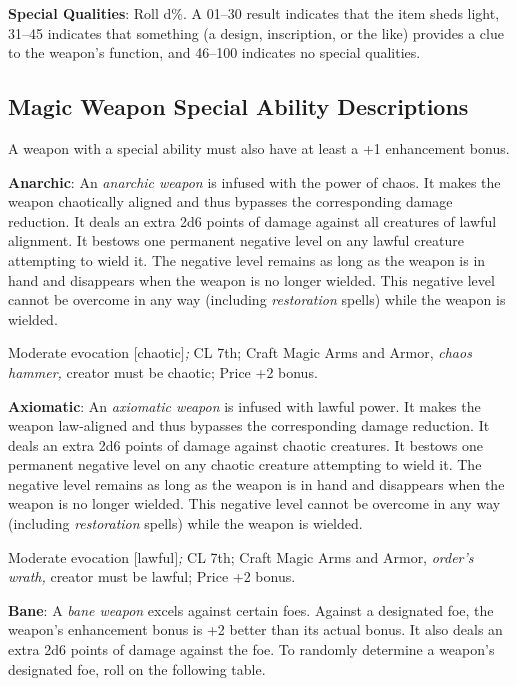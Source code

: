 \textbf{Special Qualities}: Roll d\%. A 01--30 result indicates that the item sheds light, 31--45 indicates that something (a design, inscription, or the like) provides a clue to the weapon's function, and 46--100 indicates no special qualities. 
				
\subsection{Magic Weapon Special Ability Descriptions}

				
A weapon with a special ability must also have at least a +1 enhancement bonus.
				
\textbf{Anarchic}: An \textit{anarchic weapon} is infused with the power of chaos. It makes the weapon chaotically aligned and thus bypasses the corresponding damage reduction. It deals an extra 2d6 points of damage against all creatures of lawful alignment. It bestows one permanent negative level on any lawful creature attempting to wield it. The negative level remains as long as the weapon is in hand and disappears when the weapon is no longer wielded. This negative level cannot be overcome in any way (including \textit{restoration }spells) while the weapon is wielded.
				
Moderate evocation \mbox{$[$}chaotic\mbox{$]$}\textit{; }CL 7th; Craft Magic Arms and Armor, \textit{chaos hammer, }creator must be chaotic; Price +2 bonus.
				
\textbf{Axiomatic}: An \textit{axiomatic weapon} is infused with lawful power. It makes the weapon law-aligned and thus bypasses the corresponding damage reduction. It deals an extra 2d6 points of damage against chaotic creatures. It bestows one permanent negative level on any chaotic creature attempting to wield it. The negative level remains as long as the weapon is in hand and disappears when the weapon is no longer wielded. This negative level cannot be overcome in any way (including \textit{restoration }spells) while the weapon is wielded.
				
Moderate evocation \mbox{$[$}lawful\mbox{$]$}\textit{; }CL 7th; Craft Magic Arms and Armor, \textit{order's wrath, }creator must be lawful; Price +2 bonus.
				
\textbf{Bane}: A \textit{bane weapon} excels against certain foes. Against a designated foe, the weapon's enhancement bonus is +2 better than its actual bonus. It also deals an extra 2d6 points of damage against the foe. To randomly determine a weapon's designated foe, roll on the following table.

